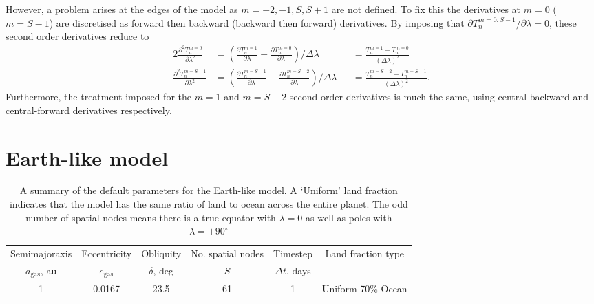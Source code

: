 \documentclass[12pt, onecolumn]{revtex4-2}    %
\newcommand{\degrees}{\ensuremath{^{\circ}}}
\newcommand{\partialderiv}[2]{\frac{\partial {#1}}{\partial {#2}}}
\newcommand{\partialderivsecnd}[2]{\frac{\partial^2 {#1}}{\partial {#2}^2}}
\begin{document}
However, a problem arises at the edges of the model as $m=-2, -1, S, S+1$ are not defined.
To fix this the derivatives at $m=0$ ($m=S-1$) are discretised as forward then backward (backward then forward) derivatives.
By imposing that ${\partial T^{m=0, S-1}_n}/{\partial \lambda} = 0$, these second order derivatives reduce to
\begin{alignat}{2}
    \partialderivsecnd{T^{m=0}_n}{\lambda}   & = \left(\partialderiv{T^{m=1}_n}{\lambda} - \partialderiv{T^{m=0}_n}{\lambda}\right) / \Delta\lambda     &  & = \frac{T^{m=1}_n - T^{m=0}_n}{(\Delta\lambda)^2}
    \label{eq:forward_backward}                                                                                                                                                                                     \\
    \partialderivsecnd{T^{m=S-1}_n}{\lambda} & = \left(\partialderiv{T^{m=S-1}_n}{\lambda} - \partialderiv{T^{m=S-2}_n}{\lambda}\right) / \Delta\lambda &  & = \frac{T^{m=S-2}_n - T^{m=S-1}_n}{(\Delta\lambda)^2}.
    \label{eq:backward_forward}
\end{alignat}
Furthermore, the treatment imposed for the $m=1$ and $m=S-2$ second order derivatives is much the same, using central-backward and central-forward derivatives respectively.


\section{Earth-like model} \label{sec:EarthLikeModel}
\begin{table*}
    \begin{tabular}{|c|c|c|c|c|c|}
        \hline
        Semimajoraxis        & Eccentricity     & Obliquity     & No. spatial nodes & Timestep         & \multirow{2}{*}{Land fraction type} \\
        $a_{\text{gas}}$, au & $e_{\text{gas}}$ & $\delta$, deg & $S$               & $\Delta t$, days &                                     \\
        \hline
        1                    & 0.0167           & 23.5          & 61                & 1                & Uniform 70\% Ocean                  \\
        \hline
    \end{tabular}
    \caption{A summary of the default parameters for the Earth-like model.
        A `Uniform' land fraction indicates that the model has the same ratio of land to ocean across the entire planet.
        The odd number of spatial nodes means there is a true equator with $\lambda = 0$ as well as poles with $\lambda = \pm 90\degrees$}
    \label{tab:default_params}
\end{table*}
\end{document}
